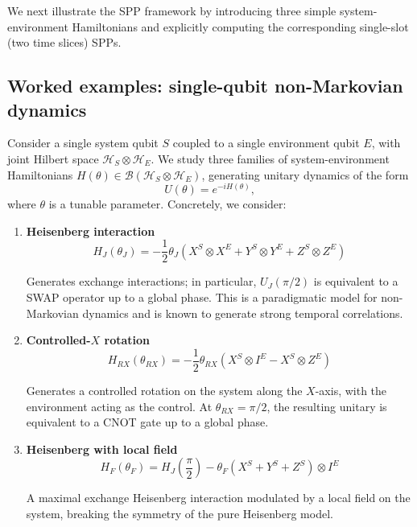\documentclass[
    aps,
    prx,
    reprint,
    superscriptaddress,
    longbibliography,
    nofootinbib,
    floatfix,
]{revtex4-2}
\begin{document}
We next illustrate the SPP framework by introducing three simple system-environment Hamiltonians and explicitly computing the corresponding single-slot (two time slices) SPPs.

\subsection{Worked examples: single-qubit non-Markovian dynamics}
Consider a single system qubit \(S\) coupled to a single environment qubit \(E\), with joint Hilbert space \(\mathcal{H}_S \otimes \mathcal{H}_E\). We study three families of system-environment Hamiltonians \(H(\theta)\in\mathcal{B}(\mathcal{H}_S\otimes\mathcal{H}_E)\), generating unitary dynamics of the form
\begin{equation}
  U(\theta) = e^{-iH(\theta)},
\end{equation}
where \(\theta\) is a tunable parameter. Concretely, we consider:
\begin{enumerate}
    \item \textbf{Heisenberg interaction}
    \begin{equation}
        H_J(\theta_J) = -\frac{1}{2} \theta_J (X^S \otimes X^E + Y^S \otimes Y^E + Z^S \otimes Z^E)
    \end{equation}

    Generates exchange interactions; in particular, \(U_J(\pi/2)\) is equivalent to a SWAP operator up to a global phase. This is a paradigmatic model for non-Markovian dynamics and is known to generate strong temporal correlations.

    \item \textbf{Controlled-\(X\) rotation}
    \begin{equation}
        H_{RX}(\theta_{RX}) = -\frac{1}{2} \theta_{RX}  (X^S \otimes I^E - X^S \otimes Z^E)
    \end{equation}

    Generates a controlled rotation on the system along the \(X\)-axis, with the environment acting as the control. At \(\theta_{RX} = \pi/2\), the resulting unitary is equivalent to a CNOT gate up to a global phase.

    \item \textbf{Heisenberg with local field}
    \begin{equation}
        H_F(\theta_F) = H_J(\frac{\pi}{2}) - \theta_F(X^S + Y^S + Z^S) \otimes I^E
    \end{equation}

    A maximal exchange Heisenberg interaction modulated by a local field on the system, breaking the symmetry of the pure Heisenberg model.
\end{enumerate}
\end{document}

